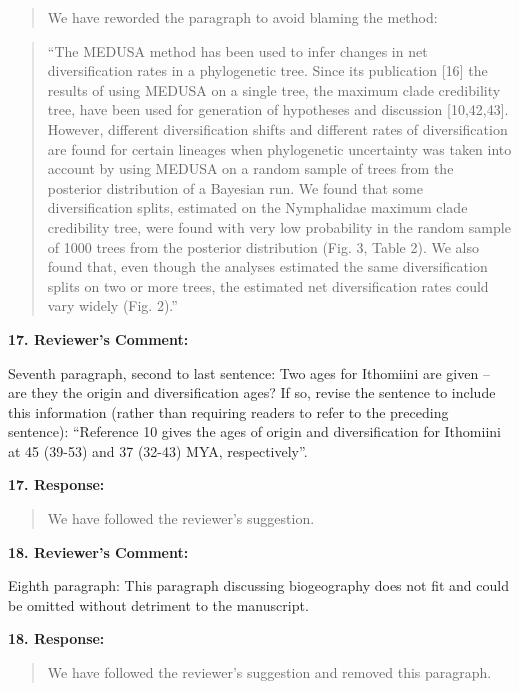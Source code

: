 \documentclass[]{article}
\begin{document}
\begin{quote}
\color{blue}
We have reworded the paragraph to avoid blaming the method:
\end{quote}

\begin{quote}
\color{blue}
``The MEDUSA method has been used to infer changes in net
diversification rates in a phylogenetic tree. Since its publication
{[}16{]} the results of using MEDUSA on a single tree, the maximum clade
credibility tree, have been used for generation of hypotheses and
discussion {[}10,42,43{]}. However, different diversification shifts and
different rates of diversification are found for certain lineages when
phylogenetic uncertainty was taken into account by using MEDUSA on a
random sample of trees from the posterior distribution of a Bayesian
run. We found that some diversification splits, estimated on the
Nymphalidae maximum clade credibility tree, were found with very low
probability in the random sample of 1000 trees from the posterior
distribution (Fig. 3, Table 2). We also found that, even though the
analyses estimated the same diversification splits on two or more trees,
the estimated net diversification rates could vary widely (Fig. 2).''
\end{quote}

\textbf{17. Reviewer's Comment:}

Seventh paragraph, second to last sentence: Two ages for Ithomiini are
given -- are they the origin and diversification ages? If so, revise the
sentence to include this information (rather than requiring readers to
refer to the preceding sentence): ``Reference 10 gives the ages of
origin and diversification for Ithomiini at 45 (39-53) and 37 (32-43)
MYA, respectively''.

\textbf{17. Response:}

\begin{quote}
\color{blue}
We have followed the reviewer's suggestion.
\end{quote}

\textbf{18. Reviewer's Comment:}

Eighth paragraph: This paragraph discussing biogeography does not fit
and could be omitted without detriment to the manuscript.

\textbf{18. Response:}

\begin{quote}
\color{blue}
We have followed the reviewer's suggestion and removed this paragraph.
\end{quote}
\end{document}
